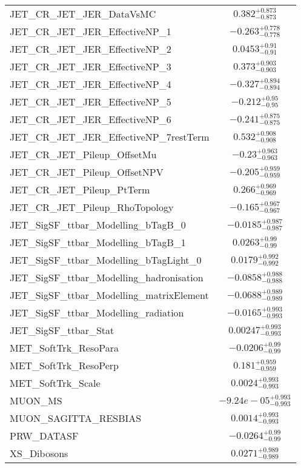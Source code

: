 \begin{tabular}{|l|c|}
JET\_CR\_JET\_JER\_DataVsMC & $0.382^{+0.873}_{-0.873}$ \\
JET\_CR\_JET\_JER\_EffectiveNP\_1 & $-0.263^{+0.778}_{-0.778}$ \\
JET\_CR\_JET\_JER\_EffectiveNP\_2 & $0.0453^{+0.91}_{-0.91}$ \\
JET\_CR\_JET\_JER\_EffectiveNP\_3 & $0.373^{+0.903}_{-0.903}$ \\
JET\_CR\_JET\_JER\_EffectiveNP\_4 & $-0.327^{+0.894}_{-0.894}$ \\
JET\_CR\_JET\_JER\_EffectiveNP\_5 & $-0.212^{+0.95}_{-0.95}$ \\
JET\_CR\_JET\_JER\_EffectiveNP\_6 & $-0.241^{+0.875}_{-0.875}$ \\
JET\_CR\_JET\_JER\_EffectiveNP\_7restTerm & $0.532^{+0.908}_{-0.908}$ \\
JET\_CR\_JET\_Pileup\_OffsetMu & $-0.23^{+0.963}_{-0.963}$ \\
JET\_CR\_JET\_Pileup\_OffsetNPV & $-0.205^{+0.959}_{-0.959}$ \\
JET\_CR\_JET\_Pileup\_PtTerm & $0.266^{+0.969}_{-0.969}$ \\
JET\_CR\_JET\_Pileup\_RhoTopology & $-0.165^{+0.967}_{-0.967}$ \\
JET\_SigSF\_ttbar\_Modelling\_bTagB\_0 & $-0.0185^{+0.987}_{-0.987}$ \\
JET\_SigSF\_ttbar\_Modelling\_bTagB\_1 & $0.0263^{+0.99}_{-0.99}$ \\
JET\_SigSF\_ttbar\_Modelling\_bTagLight\_0 & $0.0179^{+0.992}_{-0.992}$ \\
JET\_SigSF\_ttbar\_Modelling\_hadronisation & $-0.0858^{+0.988}_{-0.988}$ \\
JET\_SigSF\_ttbar\_Modelling\_matrixElement & $-0.0688^{+0.989}_{-0.989}$ \\
JET\_SigSF\_ttbar\_Modelling\_radiation & $-0.0165^{+0.993}_{-0.993}$ \\
JET\_SigSF\_ttbar\_Stat & $0.00247^{+0.993}_{-0.993}$ \\
MET\_SoftTrk\_ResoPara & $-0.0206^{+0.99}_{-0.99}$ \\
MET\_SoftTrk\_ResoPerp & $0.181^{+0.959}_{-0.959}$ \\
MET\_SoftTrk\_Scale & $0.0024^{+0.993}_{-0.993}$ \\
MUON\_MS & $-9.24e-05^{+0.993}_{-0.993}$ \\
MUON\_SAGITTA\_RESBIAS & $0.0014^{+0.993}_{-0.993}$ \\
PRW\_DATASF & $-0.0264^{+0.99}_{-0.99}$ \\
XS\_Dibosons & $0.0271^{+0.989}_{-0.989}$ \\

\end{tabular}
